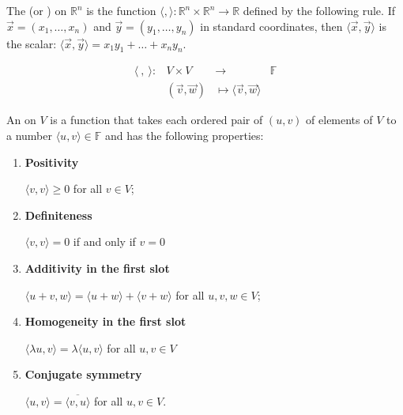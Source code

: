 \documentclass[11pt,fleqn]{book} %
\begin{document}
\setcounter{chapter}{4}\label{Def4_3_1}
\begin{definition}
    The  (or ) on $\mathbb{R}^n$ is the function $\langle , \rangle : \mathbb{R}^n \times \mathbb{R}^n \to \mathbb{R}$ defined by the following rule. If $\vec{x} = (x_1, \dots, x_n)$ and $\vec{y} =  (y_1, \dots, y_n)$ in standard coordinates, then $\langle \vec{x}, \vec{y} \rangle$ is the scalar: $\langle \vec{x}, \vec{y} \rangle = x_1y_1 + \dots + x_ny_n$. 
\end{definition}
\setcounter{chapter}{3}

\setcounter{section}{0}
\setcounter{definitionT}{0}
\begin{definition}
    $$\begin{matrix} \langle~,~\rangle: &V \times V &\to &\mathbb{F} \\ &(\overrightarrow{v}, \overrightarrow{w}) &\mapsto \langle \overrightarrow{v}, \overrightarrow{w} \rangle \end{matrix}$$

    An  on $V$ is a function that takes each ordered pair of $(u, v)$ of elements of $V$ to a number $\langle u, v \rangle \in \mathbb{F}$ and has the following properties:
    
    \begin{enumerate}[label=\alph*)]
        \item \textbf{Positivity}
        
        $\langle v, v \rangle \ge 0$ for all $v \in V$;
        
        \item \textbf{Definiteness}
        
        $\langle v, v \rangle = 0$ if and only if $v = 0$
        
        \item \textbf{Additivity in the first slot}

        $\langle u + v, w \rangle = \langle u + w \rangle + \langle v + w \rangle$ for all $u, v, w \in V$;
        
        \item \textbf{Homogeneity in the first slot}

        $\langle \lambda u, v \rangle = \lambda\langle u, v\rangle$ for all $u, v \in V$
        
        \item \textbf{Conjugate symmetry}
        
        $\langle u, v \rangle = \overline{\langle v, u \rangle}$ for all $u, v \in V$.
    \end{enumerate}
\end{definition}
\setcounter{section}{3}
\end{document}
